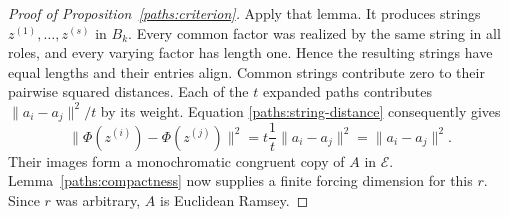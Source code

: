 \begin{proof}[Proof of Proposition~\ref{paths:criterion}]
Apply that lemma. It produces strings $z^{(1)},\ldots,z^{(s)}$ in $B_k$. Every common
factor was realized by the same string in all roles, and every
varying factor has length one. Hence the resulting strings have equal
lengths and their entries align. Common strings contribute zero to
their pairwise squared distances. Each of the $t$ expanded paths
contributes
$\|a_i-a_j\|^2/t$ by its weight. Equation
\eqref{paths:string-distance} consequently gives
\[
\|\Phi(z^{(i)})-\Phi(z^{(j)})\|^2
=t\frac1t\|a_i-a_j\|^2
=\|a_i-a_j\|^2.
\]
Their images form a monochromatic congruent copy of $A$ in
$\mathcal E$. Lemma~\ref{paths:compactness} now supplies a finite
forcing dimension for this $r$. Since $r$ was arbitrary, $A$ is
Euclidean Ramsey.
\end{proof}
